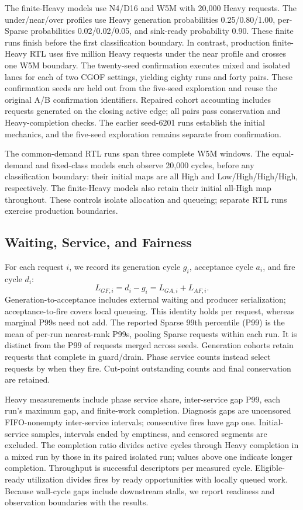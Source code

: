 The finite-Heavy models use N4/D16 and W5M with 20,000 Heavy requests. The under/near/over profiles use Heavy generation probabilities 0.25/0.80/1.00, per-Sparse probabilities 0.02/0.02/0.05, and sink-ready probability 0.90. These finite runs finish before the first classification boundary. In contrast, production finite-Heavy RTL uses five million Heavy requests under the near profile and crosses one W5M boundary. The twenty-seed confirmation executes mixed and isolated lanes for each of two CGOF settings, yielding eighty runs and forty pairs. These confirmation seeds are held out from the five-seed exploration and reuse the original A/B confirmation identifiers. Repaired cohort accounting includes requests generated on the closing active edge; all pairs pass conservation and Heavy-completion checks. The earlier seed-6201 runs establish the initial mechanics, and the five-seed exploration remains separate from confirmation.

The common-demand RTL runs span three complete W5M windows. The equal-demand and fixed-class models each observe 20,000 cycles, before any classification boundary: their initial maps are all High and Low/High/High/High, respectively. The finite-Heavy models also retain their initial all-High map throughout. These controls isolate allocation and queueing; separate RTL runs exercise production boundaries.

\subsection{Waiting, Service, and Fairness}
For each request $i$, we record its generation cycle $g_i$, acceptance cycle $a_i$, and fire cycle $d_i$:
\begin{equation}
L_{GF,i}=d_i-g_i=L_{GA,i}+L_{AF,i}.
\label{eq:latency-v3}
\end{equation}
Generation-to-acceptance includes external waiting and producer serialization; acceptance-to-fire covers local queueing. This identity holds per request, whereas marginal P99s need not add. The reported Sparse 99th percentile (P99) is the mean of per-run nearest-rank P99s, pooling Sparse requests within each run. It is distinct from the P99 of requests merged across seeds. Generation cohorts retain requests that complete in guard/drain. Phase service counts instead select requests by when they fire. Cut-point outstanding counts and final conservation are retained.

Heavy measurements include phase service share, inter-service gap P99, each run's maximum gap, and finite-work completion. Diagnosis gaps are uncensored FIFO-nonempty inter-service intervals; consecutive fires have gap one. Initial-service samples, intervals ended by emptiness, and censored segments are excluded. The completion ratio divides active cycles through Heavy completion in a mixed run by those in its paired isolated run; values above one indicate longer completion. Throughput is successful descriptors per measured cycle. Eligible-ready utilization divides fires by ready opportunities with locally queued work. Because wall-cycle gaps include downstream stalls, we report readiness and observation boundaries with the results.

